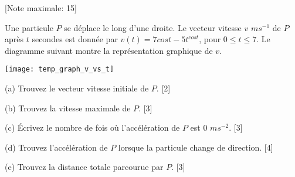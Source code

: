 \begin{question}
  \hspace*{\fill} [Note maximale: 15]\par
  \medskip
  \noindent Une particule $P$ se déplace le long d’une droite. Le vecteur vitesse $v$ $ms^{-1}$ de $P$ après $t$ secondes est donnée par $v(t) = 7 cos t - 5t^{cos t}$, pour $0 \le t \le 7$. Le diagramme suivant montre la représentation graphique de $v$.\par
  \medskip
  \texttt{[image: temp\_graph\_v\_vs\_t]}\par
  \medskip
  (a) Trouvez le vecteur vitesse initiale de $P$.\hspace*{\fill} [2]\par
  \medskip
  (b) Trouvez la vitesse maximale de $P$.\hspace*{\fill} [3]\par
  \medskip
  (c) Écrivez le nombre de fois où l’accélération de $P$ est $0$ $ms^{-2}.$\hspace*{\fill} [3]\par
  \medskip
  (d) Trouvez l’accélération de $P$ lorsque la particule change de direction.\hspace*{\fill} [4]\par
  \medskip
  (e) Trouvez la distance totale parcourue par $P$.\hspace*{\fill} [3]\par
\end{question}

